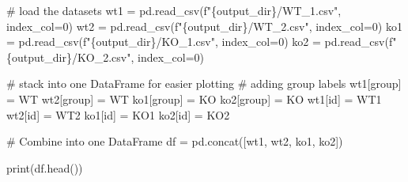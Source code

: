 \documentclass[
  letterpaper,
  DIV=11,
  numbers=noendperiod]{scrartcl}
\newenvironment{Shaded}{\begin{snugshade}}{\end{snugshade}}
\newcommand{\BuiltInTok}[1]{\textcolor[rgb]{0.00,0.23,0.31}{#1}}
\newcommand{\CommentTok}[1]{\textcolor[rgb]{0.37,0.37,0.37}{#1}}
\newcommand{\DecValTok}[1]{\textcolor[rgb]{0.68,0.00,0.00}{#1}}
\newcommand{\NormalTok}[1]{\textcolor[rgb]{0.00,0.23,0.31}{#1}}
\newcommand{\OperatorTok}[1]{\textcolor[rgb]{0.37,0.37,0.37}{#1}}
\newcommand{\SpecialCharTok}[1]{\textcolor[rgb]{0.37,0.37,0.37}{#1}}
\newcommand{\SpecialStringTok}[1]{\textcolor[rgb]{0.13,0.47,0.30}{#1}}
\newcommand{\StringTok}[1]{\textcolor[rgb]{0.13,0.47,0.30}{#1}}
\begin{document}
\begin{Shaded}
\begin{Highlighting}[]
\CommentTok{\# load the datasets}
\NormalTok{wt1 }\OperatorTok{=}\NormalTok{ pd.read\_csv(}\SpecialStringTok{f"}\SpecialCharTok{\{}\NormalTok{output\_dir}\SpecialCharTok{\}}\SpecialStringTok{/WT\_1.csv"}\NormalTok{, index\_col}\OperatorTok{=}\DecValTok{0}\NormalTok{)}
\NormalTok{wt2 }\OperatorTok{=}\NormalTok{ pd.read\_csv(}\SpecialStringTok{f"}\SpecialCharTok{\{}\NormalTok{output\_dir}\SpecialCharTok{\}}\SpecialStringTok{/WT\_2.csv"}\NormalTok{, index\_col}\OperatorTok{=}\DecValTok{0}\NormalTok{)}
\NormalTok{ko1 }\OperatorTok{=}\NormalTok{ pd.read\_csv(}\SpecialStringTok{f"}\SpecialCharTok{\{}\NormalTok{output\_dir}\SpecialCharTok{\}}\SpecialStringTok{/KO\_1.csv"}\NormalTok{, index\_col}\OperatorTok{=}\DecValTok{0}\NormalTok{)}
\NormalTok{ko2 }\OperatorTok{=}\NormalTok{ pd.read\_csv(}\SpecialStringTok{f"}\SpecialCharTok{\{}\NormalTok{output\_dir}\SpecialCharTok{\}}\SpecialStringTok{/KO\_2.csv"}\NormalTok{, index\_col}\OperatorTok{=}\DecValTok{0}\NormalTok{)}

\CommentTok{\# stack into one DataFrame for easier plotting}
\CommentTok{\# adding group labels}
\NormalTok{wt1[}\StringTok{\textquotesingle{}group\textquotesingle{}}\NormalTok{] }\OperatorTok{=} \StringTok{\textquotesingle{}WT\textquotesingle{}}
\NormalTok{wt2[}\StringTok{\textquotesingle{}group\textquotesingle{}}\NormalTok{] }\OperatorTok{=} \StringTok{\textquotesingle{}WT\textquotesingle{}}
\NormalTok{ko1[}\StringTok{\textquotesingle{}group\textquotesingle{}}\NormalTok{] }\OperatorTok{=} \StringTok{\textquotesingle{}KO\textquotesingle{}}
\NormalTok{ko2[}\StringTok{\textquotesingle{}group\textquotesingle{}}\NormalTok{] }\OperatorTok{=} \StringTok{\textquotesingle{}KO\textquotesingle{}}
\NormalTok{wt1[}\StringTok{\textquotesingle{}id\textquotesingle{}}\NormalTok{] }\OperatorTok{=} \StringTok{\textquotesingle{}WT1\textquotesingle{}}
\NormalTok{wt2[}\StringTok{\textquotesingle{}id\textquotesingle{}}\NormalTok{] }\OperatorTok{=} \StringTok{\textquotesingle{}WT2\textquotesingle{}}
\NormalTok{ko1[}\StringTok{\textquotesingle{}id\textquotesingle{}}\NormalTok{] }\OperatorTok{=} \StringTok{\textquotesingle{}KO1\textquotesingle{}}
\NormalTok{ko2[}\StringTok{\textquotesingle{}id\textquotesingle{}}\NormalTok{] }\OperatorTok{=} \StringTok{\textquotesingle{}KO2\textquotesingle{}}

\CommentTok{\# Combine into one DataFrame}
\NormalTok{df }\OperatorTok{=}\NormalTok{ pd.concat([wt1, wt2, ko1, ko2])}

\BuiltInTok{print}\NormalTok{(df.head())}
\end{Highlighting}
\end{Shaded}
\end{document}
